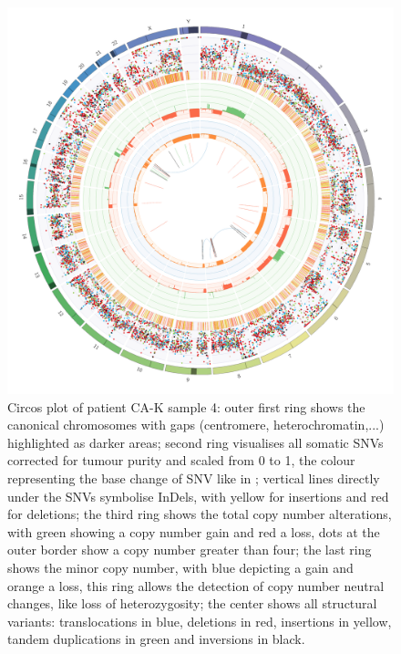 \begin{figure}[ht]
\centering
\includegraphics[width=.99\linewidth]{Figures/CASCADE/CA82/CA82-4.circos.png}
\caption[Circos plot of patient CA-K sample 4]{Circos plot of patient CA-K sample 4: outer first ring shows the canonical chromosomes with gaps (centromere, heterochromatin,...) highlighted as darker areas; second ring visualises all somatic SNVs corrected for tumour purity and scaled from 0 to 1, the colour representing the base change of SNV like in \protect\textcite{Alexandrov2013}; vertical lines directly under the SNVs symbolise InDels, with yellow for insertions and red for deletions; the third ring shows the total copy number alterations, with green showing a copy number gain and red a loss, dots at the outer border show a copy number greater than four; the last ring shows the minor copy number, with blue depicting a gain and orange a loss, this ring allows the detection of copy number neutral changes, like loss of heterozygosity; the center shows all structural variants: translocations in blue, deletions in red, insertions in yellow, tandem duplications in green and inversions in black.} \label{fig:ca82.4circos}
\end{figure}

